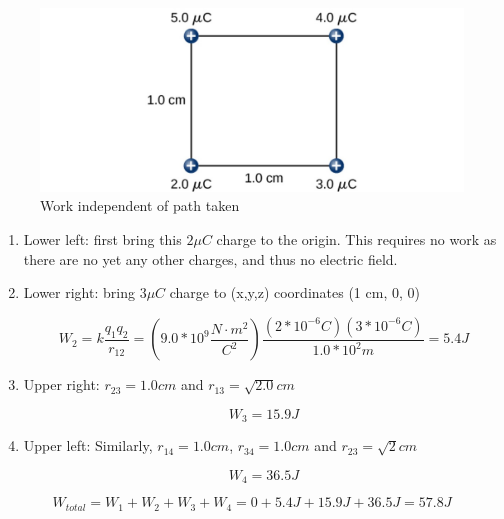 \documentclass[14pt]{memoir}
\begin{document}
\begin{figure}[H]
\begin{center}
\includegraphics[scale=0.40]{fig/fig_07_08.jpg}
\caption{Work independent of path taken}
\label{fig:07_08}
\end{center}
\end{figure}

\begin{enumerate}


\item Lower left: first bring this $2 \mu C$ charge to the origin. This requires no work as there are no yet any other charges, and thus no electric field. 

\item Lower right: bring $3 \mu C$ charge to (x,y,z) coordinates (1 cm, 0, 0)

\begin{equation}
W_2 = k \frac{q_1 q_2}{r_12} = (9.0 * 10^{9} \frac{N \cdot m^2}{C^2}) \frac{(2* 10^{-6} C) (3* 10^{-6} C) }{1.0 * 10^{2} m} = 5.4 J
\end{equation}

\item Upper right: $r_{23} = 1.0 cm$ and $r_{13} = \sqrt{2.0} cm$

\begin{equation}
W_3 = 15.9 J
\end{equation}

\item Upper left: Similarly, $r_{14} = 1.0 cm$, $r_{34} = 1.0 cm$ and $r_{23} = \sqrt{2} cm$

\begin{equation}
W_4 = 36.5 J
\end{equation}
\end{enumerate}

\begin{equation}
W_{total} = W_1 + W_2 + W_3 + W_4 = 0 + 5.4J + 15.9J + 36.5J = 57.8J
\end{equation}
\end{document}
